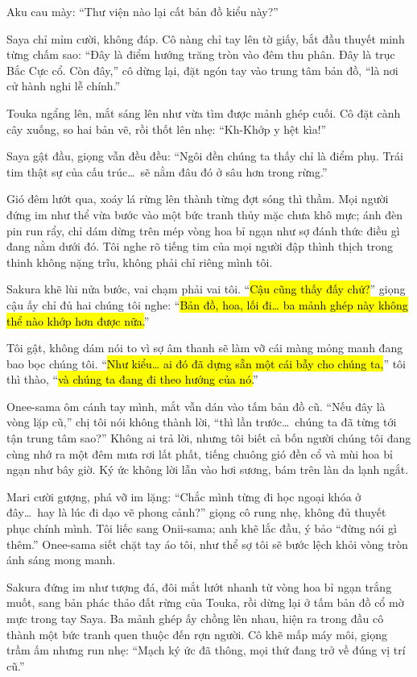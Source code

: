 \documentclass[../main.tex]{subfiles}
\begin{document}
Aku cau mày: ``Thư viện nào lại cất bản đồ kiểu này?''

Saya chỉ mỉm cười, không đáp. Cô nàng chỉ tay lên tờ giấy, bắt đầu thuyết minh từng chấm sao: ``Đây là điểm hướng trăng tròn vào đêm thu phân. Đây là trục Bắc Cực cổ. Còn đây,'' cô dừng lại, đặt ngón tay vào trung tâm bản đồ, ``là nơi cử hành nghi lễ chính.''

Touka ngẩng lên, mắt sáng lên như vừa tìm được mảnh ghép cuối. Cô đặt cành cây xuống, so hai bản vẽ, rồi thốt lên nhẹ: ``Kh-Khớp y hệt kìa!''

Saya gật đầu, giọng vẫn đều đều: ``Ngôi đền chúng ta thấy chỉ là điểm phụ. Trái tim thật sự của cấu trúc\dots\ sẽ nằm đâu đó ở sâu hơn trong rừng.''

Gió đêm lướt qua, xoáy lá rừng lên thành từng đợt sóng thì thầm. Mọi người đứng im như thể vừa bước vào một bức tranh thủy mặc chưa khô mực; ánh đèn pin run rẩy, chỉ dám dừng trên mép vòng hoa bỉ ngạn như sợ đánh thức điều gì đang nằm dưới đó. Tôi nghe rõ tiếng tim của mọi người đập thình thịch trong thinh không nặng trĩu, không phải chỉ riêng mình tôi.

Sakura khẽ lùi nửa bước, vai chạm phải vai tôi. ``\hl{Cậu cũng thấy đấy chứ?}'' giọng cậu ấy chỉ đủ hai chúng tôi nghe: ``\hl{Bản đồ, hoa, lối đi\dots{} ba mảnh ghép này không thể nào khớp hơn được nữa.}''

Tôi gật, không dám nói to vì sợ âm thanh sẽ làm vỡ cái màng mỏng manh đang bao bọc chúng tôi. ``\hl{Như kiểu\dots{} ai đó đã dựng sẵn một cái bẫy cho chúng ta,}'' tôi thì thào, ``\hl{và chúng ta đang đi theo hướng của nó.}''

Onee-sama ôm cánh tay mình, mắt vẫn dán vào tấm bản đồ cũ. ``Nếu đây là vòng lặp cũ,'' chị tôi nói không thành lời, ``thì lần trước\dots\ chúng ta đã từng tới tận trung tâm sao?'' Không ai trả lời, nhưng tôi biết cả bốn người chúng tôi đang cùng nhớ ra một đêm mưa rơi lất phất, tiếng chuông gió đền cổ và mùi hoa bỉ ngạn như bây giờ. Ký ức không lời lẫn vào hơi sương, bám trên làn da lạnh ngắt.

Mari cười gượng, phá vỡ im lặng: ``Chắc mình từng đi học ngoại khóa ở đây\dots\ hay là lúc đi dạo vẽ phong cảnh?'' giọng cô rung nhẹ, không đủ thuyết phục chính mình. Tôi liếc sang Onii-sama; anh khẽ lắc đầu, ý bảo ``đừng nói gì thêm.'' Onee-sama siết chặt tay áo tôi, như thể sợ tôi sẽ bước lệch khỏi vòng tròn ánh sáng mong manh.

Sakura đứng im như tượng đá, đôi mắt lướt nhanh từ vòng hoa bỉ ngạn trắng muốt, sang bản phác thảo đất rừng của Touka, rồi dừng lại ở tấm bản đồ cổ mờ mực trong tay Saya. Ba mảnh ghép ấy chồng lên nhau, hiện ra trong đầu cô thành một bức tranh quen thuộc đến rợn người. Cô khẽ mấp máy môi, giọng trầm ấm nhưng run nhẹ: ``Mạch ký ức đã thông, mọi thứ đang trở về đúng vị trí cũ.''
\end{document}
